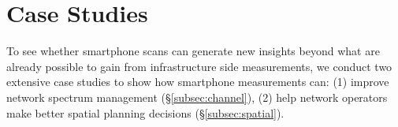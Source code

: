 \section{Case Studies}
\label{sec:case}

To see whether smartphone scans can generate new insights beyond what are
already possible to gain from infrastructure side measurements, we conduct two
extensive case studies to show how smartphone measurements can: (1) improve
network spectrum management (\S\ref{subsec:channel}), (2) help network operators
make better spatial planning decisions (\S\ref{subsec:spatial}).



